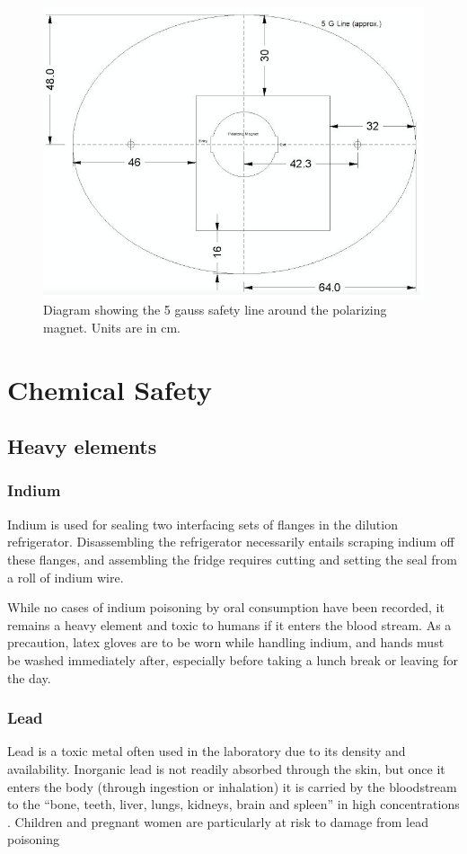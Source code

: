 \begin{figure}
 \centering
 \includegraphics[scale=0.5]{./img/polmag-5gauss-line.jpg}
 \caption{Diagram showing the 5 gauss safety line around the polarizing magnet.  Units are in cm.}
 \label{fig:polmag-5gauss-line}
\end{figure}


\section{Chemical Safety}
\subsection{Heavy elements}
\subsubsection{Indium}
Indium is used for sealing two interfacing sets of flanges in the dilution refrigerator.  Disassembling the refrigerator necessarily entails scraping indium off these flanges, and assembling the fridge requires cutting and setting the seal from a roll of indium wire.

While no cases of indium poisoning by oral consumption have been recorded, it remains a heavy element and toxic to humans if it enters the blood stream.  As a precaution, latex gloves are to be worn while handling indium, and hands must be washed immediately after, especially before taking a lunch break or leaving for the day.

\subsubsection{Lead}
Lead is a toxic metal often used in the laboratory due to its density and availability.  Inorganic lead is not readily absorbed through the skin, but once it enters the body (through ingestion or inhalation) it is carried by the bloodstream to the ``bone, teeth, liver, lungs, kidneys, brain and spleen'' in high concentrations \cite{aafp98}.  Children and pregnant women are particularly at risk to damage from lead poisoning \cite{epa13}


